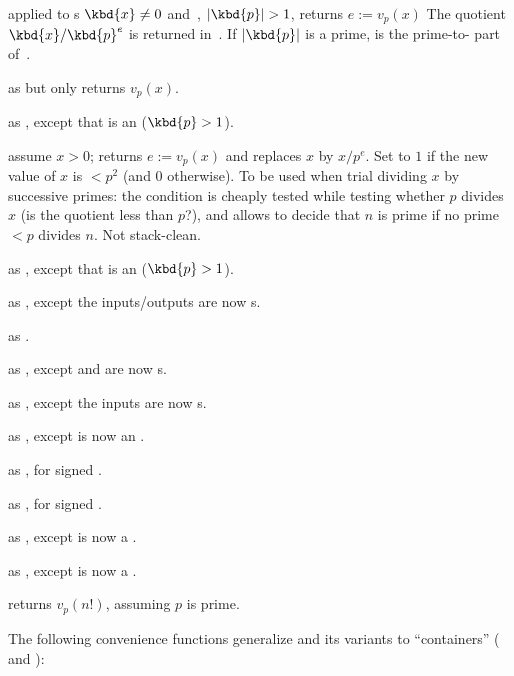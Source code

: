  applied to s
$\kbd{x}\neq 0$ and~, $|\kbd{p}| > 1$, returns $e := v_p(x)$
The quotient $\kbd{x}/\kbd{p}^e$ is returned in~. If
$|\kbd{p}|$ is a prime,  is the prime-to- part of~.

 as  but only returns
$v_p(x)$.

 as ,
except that  is an  ($\kbd{p} > 1$).

 assume $x > 0$;
returns $e := v_p(x)$ and replaces $x$ by $x / p^e$. Set  to $1$ if
the new value of $x$ is $ < p^2$ (and $0$ otherwise). To be used when trial
dividing $x$ by successive primes: the  condition is cheaply tested
while testing whether $p$ divides $x$ (is the quotient less than $p$?), and
allows to decide that $n$ is prime if no prime $< p$ divides $n$. Not
stack-clean.

 as ,
except that  is an  ($\kbd{p} > 1$).

 as ,
except the inputs/outputs are now s.

 as
.

 as ,
except  and  are now s.

 as ,
except the inputs are now s.

 as ,
except  is now an .

 as , for signed .

 as , for signed .

 as ,
except  is now a .

 as ,
except  is now a .

 returns $v_p(n!)$, assuming
$p$ is prime.

The following convenience functions generalize  and its variants
to ``containers'' ( and ):


